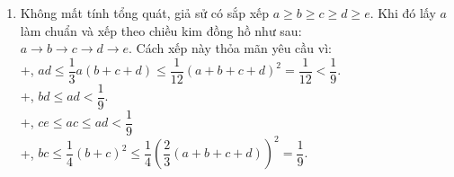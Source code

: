 \begin{ex}
{\begin{enumerate}
\begin{itemize}
                		\item Nếu $p$ là ước của ($n^2-n+1$).\\
                		Đặt $pk=n^2-n+1, k\in \mathbb N^*$ (2). Thay trở lại (1) ta có \\
                		$p(p-1)=2(n+1)pk$\\
                		$\Rightarrow p=2(n+1)k+1$\ (3)\\
                		Thay (3) vào (2) ta có:\\
                		$n^2-(2k^2+1)n+1-2k^2-k=0$ (4)\\
                		$\Delta =4k^4+12k^2+4k-3$.\\
                		Ta cần tìm $k$ sao cho $\Delta$ là số chính phương. Nhận thấy: 
                		$(2k^2+2)^2<\Delta<(2k^2+4)^2$. Suy ra $\Delta = (2k^2+3)^2$. Từ đây ta có:\\
                		$ 4k^4+12k^2+4k-3 = (2k^2+3)^2 \Rightarrow k=3$.\\
                		Thay trở lại tìm $n$ từ phương trình (4) và $p$ từ (3) ta được: $p = 127$.
         \end{itemize}
     Vậy $p=2$ hoặc $p=127$.
     \item Không mất tính tổng quát, giả sử có sắp xếp $a\ge b\ge c\ge d\ge e$. Khi đó lấy $a$ làm chuẩn và xếp theo chiều kim đồng hồ như sau: \\ $a\rightarrow b\rightarrow c\rightarrow d \rightarrow e$. Cách xếp này thỏa mãn yêu cầu vì:\\
    +, $ad \le \dfrac{1}{3}a(b+c+d)\le \dfrac{1}{12}(a+b+c+d)^2 = \dfrac{1}{12}<\dfrac{1}{9}$.\\
    +, $bd\le ad <\dfrac{1}{9}$.\\
    +, $ce \le ac\le ad <\dfrac{1}{9}$\\
    +, $bc \le \dfrac{1}{4}(b+c)^2 \le \dfrac{1}{4} \left(\dfrac{2}{3}(a+b+c+d)\right)^2= \dfrac{1}{9}.$
     \end{enumerate}
 }
\end{ex}

